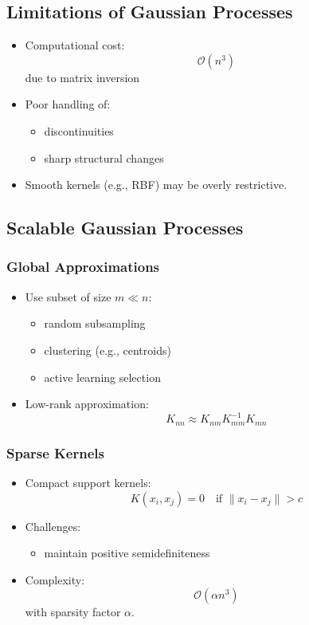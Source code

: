 \documentclass[12pt,oneside]{book}
\numberwithin{equation}{section}
\theoremstyle{definition}
\theoremstyle{plain}
\theoremstyle{remark}
\begin{document}
\subsection{Limitations of Gaussian Processes}

\begin{itemize}
\item Computational cost:
\[
\mathcal{O}(n^3)
\]
due to matrix inversion

\item Poor handling of:
\begin{itemize}
\item discontinuities
\item sharp structural changes
\end{itemize}

\item Smooth kernels (e.g., RBF) may be overly restrictive.
\end{itemize}

\subsection{Scalable Gaussian Processes}

\subsubsection*{Global Approximations}

\begin{itemize}
\item Use subset of size $m \ll n$:
\begin{itemize}
\item random subsampling
\item clustering (e.g., centroids)
\item active learning selection
\end{itemize}

\item Low-rank approximation:
\[
K_{nn} \approx K_{nm} K_{mm}^{-1} K_{mn}
\]
\end{itemize}

\subsubsection*{Sparse Kernels}

\begin{itemize}
\item Compact support kernels:
\[
K(x_i, x_j) = 0 \quad \text{if } \|x_i - x_j\| > c
\]

\item Challenges:
\begin{itemize}
\item maintain positive semidefiniteness
\end{itemize}

\item Complexity:
\[
\mathcal{O}(\alpha n^3)
\]
with sparsity factor $\alpha$.
\end{itemize}
\end{document}
